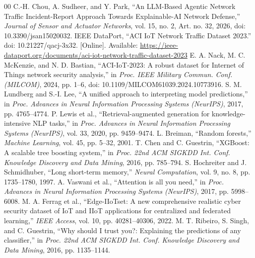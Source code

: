 \documentclass[conference]{IEEEtran}
\begin{document}
\begin{thebibliography}{00}
 C.-H. Chou, A. Sudheer, and Y. Park, ``An LLM-Based Agentic Network Traffic Incident-Report Approach Towards Explainable-AI Network Defense,'' \textit{Journal of Sensor and Actuator Networks}, vol. 15, no. 2, Art. no. 32, 2026, doi: 10.3390/jsan15020032.
 IEEE DataPort, ``ACI IoT Network Traffic Dataset 2023.'' doi: 10.21227/qacj-3x32. [Online]. Available: \url{https://ieee-dataport.org/documents/aci-iot-network-traffic-dataset-2023}
 E. A. Nack, M. C. McKenzie, and N. D. Bastian, ``ACI-IoT-2023: A robust dataset for Internet of Things network security analysis,'' in \textit{Proc. IEEE Military Commun. Conf. (MILCOM)}, 2024, pp. 1--6, doi: 10.1109/MILCOM61039.2024.10773916.
 S. M. Lundberg and S.-I. Lee, ``A unified approach to interpreting model predictions,'' in \textit{Proc. Advances in Neural Information Processing Systems (NeurIPS)}, 2017, pp. 4765--4774.
 P. Lewis et al., ``Retrieval-augmented generation for knowledge-intensive NLP tasks,'' in \textit{Proc. Advances in Neural Information Processing Systems (NeurIPS)}, vol. 33, 2020, pp. 9459--9474.
 L. Breiman, ``Random forests,'' \textit{Machine Learning}, vol. 45, pp. 5--32, 2001.
 T. Chen and C. Guestrin, ``XGBoost: A scalable tree boosting system,'' in \textit{Proc. 22nd ACM SIGKDD Int. Conf. Knowledge Discovery and Data Mining}, 2016, pp. 785--794.
 S. Hochreiter and J. Schmidhuber, ``Long short-term memory,'' \textit{Neural Computation}, vol. 9, no. 8, pp. 1735--1780, 1997.
 A. Vaswani et al., ``Attention is all you need,'' in \textit{Proc. Advances in Neural Information Processing Systems (NeurIPS)}, 2017, pp. 5998--6008.
 M. A. Ferrag et al., ``Edge-IIoTset: A new comprehensive realistic cyber security dataset of IoT and IIoT applications for centralized and federated learning,'' \textit{IEEE Access}, vol. 10, pp. 40281--40306, 2022.
 M. T. Ribeiro, S. Singh, and C. Guestrin, ``Why should I trust you?: Explaining the predictions of any classifier,'' in \textit{Proc. 22nd ACM SIGKDD Int. Conf. Knowledge Discovery and Data Mining}, 2016, pp. 1135--1144.
\end{thebibliography}
\end{document}
